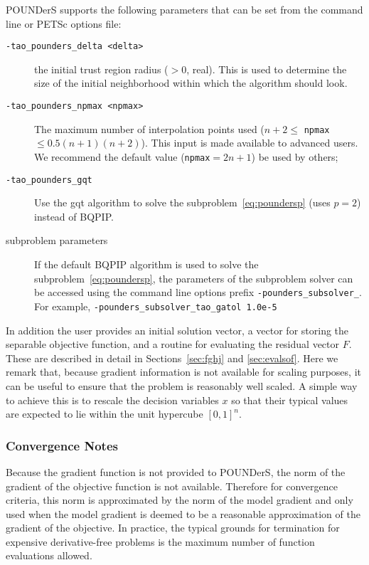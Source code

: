 POUNDerS supports the following parameters that can be set from the
command line or PETSc options file:
\begin{description}
  \item[\texttt{-tao\_pounders\_delta <delta>}] the initial trust region 
  radius ($>0$, real).
  This is  used to determine the size of the initial neighborhood within
  which the algorithm should look. 
  
  \item[\texttt{-tao\_pounders\_npmax <npmax>}] The maximum number of 
  interpolation points used
  ($n+2\leq$ \texttt{npmax} $\leq 0.5(n+1)(n+2)$). This input is made
  available to advanced users. We recommend the default
  value (\texttt{npmax}$=2n+1$) be used by others;

  \item[\texttt{-tao\_pounders\_gqt}] Use the gqt algorithm to solve the
  subproblem~\ref{eq:poundersp} (uses $p=2$) instead of BQPIP.

  \item[subproblem parameters] If the default BQPIP algorithm is used to solve the 
  subproblem~\ref{eq:poundersp}, the parameters of the subproblem solver
  can be accessed using the command line options prefix \texttt{-pounders\_subsolver\_}.  For example, \texttt{-pounders\_subsolver\_tao\_gatol 1.0e-5}
  

   
\end{description}
In addition the user provides an initial solution vector, a vector for storing
the separable objective function, and a routine for evaluating the residual
vector $F$.  These are described in detail in 
Sections~\ref{sec:fghj} and \ref{sec:evalsof}. 
Here we remark that, because gradient information is not available for
scaling purposes, it can be useful to ensure that the problem is
reasonably well scaled. A simple way to achieve this is to rescale the
decision variables $x$ so that their typical values are expected to lie
within the unit hypercube $[0,1]^n$.



\subsubsection{Convergence Notes}
Because the gradient function is not provided to POUNDerS, 
the norm of the gradient of the objective function is not available.
Therefore
for convergence criteria, this norm is approximated by the norm of the
model gradient and only used when the model gradient is deemed to be a
reasonable approximation of the gradient of the objective. In practice, the
typical grounds for termination for expensive derivative-free problems is
the maximum number of function evaluations allowed. 




